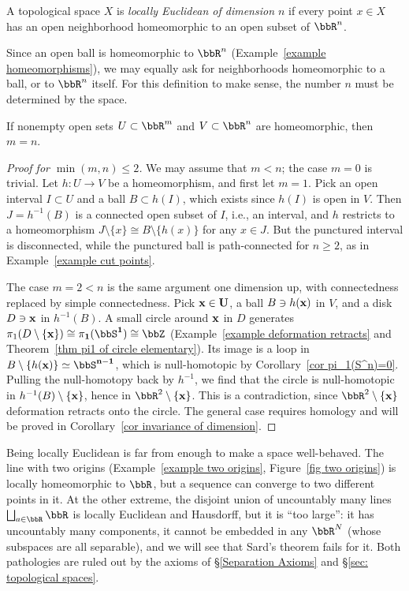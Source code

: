 \begin{defn}
    A topological space $X$ is \emph{locally Euclidean of dimension $n$} if every point $x\in X$ has an open neighborhood homeomorphic to an open subset of $\bbR^n$.
\end{defn}
Since an open ball is homeomorphic to $\bbR^n$ (Example~\ref{example homeomorphisms}), we may equally ask for neighborhoods homeomorphic to a ball, or to $\bbR^n$ itself. For this definition to make sense, the number $n$ must be determined by the space.

\begin{prop}\label{prop invariance of dimension}
    If nonempty open sets $U\subset\bbR^m$ and $V\subset\bbR^n$ are homeomorphic, then $m=n$.
\end{prop}
\begin{proof}[Proof for $\min(m,n)\leq2$]
    We may assume that $m<n$; the case $m=0$ is trivial. Let $h:U\to V$ be a homeomorphism, and first let $m=1$. Pick an open interval $I\subset U$ and a ball $B\subset h(I)$, which exists since $h(I)$ is open in $V$. Then $J=h^{-1}(B)$ is a connected open subset of $I$, i.e., an interval, and $h$ restricts to a homeomorphism $J\setminus\{x\}\cong B\setminus\{h(x)\}$ for any $x\in J$. But the punctured interval is disconnected, while the punctured ball is path-connected for $n\geq2$, as in Example~\ref{example cut points}.

    The case $m=2<n$ is the same argument one dimension up, with connectedness replaced by simple connectedness. Pick $\bf{x}\in U$, a ball $B\ni h(\bf{x})$ in $V$, and a disk $D\ni\bf{x}$ in $h^{-1}(B)$. A small circle around $\bf{x}$ in $D$ generates $\pi_1(D\setminus\{\bf{x}\})\cong\pi_1(\bbS^1)\cong\bbZ$ (Example~\ref{example deformation retracts} and Theorem~\ref{thm pi1 of circle elementary}). Its image is a loop in $B\setminus\{h(\bf{x})\}\simeq\bbS^{n-1}$, which is null-homotopic by Corollary~\ref{cor pi_1(S^n)=0}. Pulling the null-homotopy back by $h^{-1}$, we find that the circle is null-homotopic in $h^{-1}(B)\setminus\{\bf{x}\}$, hence in $\bbR^2\setminus\{\bf{x}\}$. This is a contradiction, since $\bbR^2\setminus\{\bf{x}\}$ deformation retracts onto the circle. The general case requires homology and will be proved in Corollary~\ref{cor invariance of dimension}.
\end{proof}

Being locally Euclidean is far from enough to make a space well-behaved. The line with two origins (Example~\ref{example two origins}, Figure~\ref{fig two origins}) is locally homeomorphic to $\bbR$, but a sequence can converge to two different points in it. At the other extreme, the disjoint union of uncountably many lines $\bigsqcup_{a\in\bbR}\bbR$ is locally Euclidean and Hausdorff, but it is ``too large'': it has uncountably many components, it cannot be embedded in any $\bbR^N$ (whose subspaces are all separable), and we will see that Sard's theorem fails for it. Both pathologies are ruled out by the axioms of \S\ref{Separation Axioms} and \S\ref{sec: topological spaces}.

